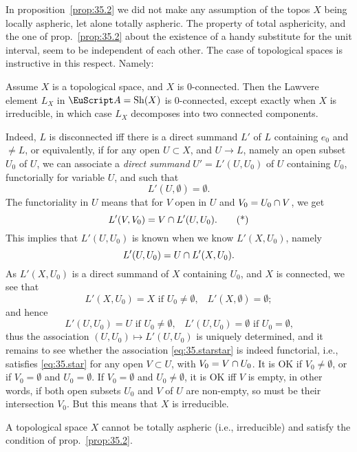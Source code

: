 In proposition~\ref{prop:35.2} we did not make any assumption of the
topos $X$ being locally aspheric, let alone totally aspheric. The
property of total asphericity, and the one of prop.~\ref{prop:35.2} about
the existence of a handy substitute for the unit interval, seem to be
independent of each other. The case of topological spaces is
instructive in this respect. Namely:
\setcounter{corollarynum}{0}
\begin{corollarynum}\label{cor:35.2.1}
  Assume $X$ is a topological space, and $X$ is $0$-connected. Then
  the Lawvere element $L_X$ in $\scrA=\Sh(X)$ is $0$-connected, except
  exactly when $X$ is irreducible, in which case $L_X$ decomposes into
  two connected components.
\end{corollarynum}

Indeed, $L$ is disconnected if{f} there is a direct summand $L'$ of
$L$ containing $e_0$ and $\ne L$, or equivalently, if for any open $U
\subset X$, and $U\to L$, namely an open subset $U_0$ of $U$, we can
associate a \emph{direct summand} $U'=L'(U,U_0)$ of $U$ containing
$U_0$, functorially for variable $U$, and such that
\[ L'(U,\emptyset) = \emptyset.\]
The functoriality in $U$ means that for $V$ open in $U$ and $V_0=U_0
\mathbin{\cap} V$, we get
\begin{equation}
  \label{eq:35.star}
  L'(V,V_0) = V \mathbin{\cap} L'(U,U_0).
  \tag{*} 
\end{equation}
This implies that $L'(U,U_0)$ is known when we know $L'(X,U_0)$,
namely
\[ L'(U,U_0) = U \mathbin{\cap} L'(X,U_0).\]
As $L'(X,U_0)$ is a direct summand of $X$ containing $U_0$, and $X$ is
connected, we see that
\[ \text{$L'(X,U_0) = X$ if $U_0\ne\emptyset$,} \quad
L'(X,\emptyset)=\emptyset; \]
and hence
\begin{equation}
  \label{eq:35.starstar}
  \text{$L'(U,U_0) = U$ if $U_0\ne\emptyset$,} \quad
  \text{$L'(U,U_0) = \emptyset$ if $U_0=\emptyset$,}
  \tag{**}
\end{equation}
thus the association $(U,U_0) \mapsto L'(U,U_0)$ is uniquely
determined, and it remains to see whether the association
\eqref{eq:35.starstar} is indeed functorial, i.e., satisfies
\eqref{eq:35.star} for any open $V \subset U$, with $V_0=V\mathbin{\cap}
U_0$. It is OK if $V_0\ne\emptyset$, or if $V_0=\emptyset$ and
$U_0=\emptyset$. If $V_0=\emptyset$ and $U_0\ne\emptyset$, it is OK
if{f} $V$ is empty, in other words, if both open subsets $U_0$ and $V$
of $U$ are non-empty, so must be their intersection $V_0$. But this
means that $X$ is irreducible.

\begin{corollarynum}\label{cor:35.2.2}
  A topological space $X$ cannot be totally aspheric (i.e.,
  irreducible) and satisfy the condition of prop.~\textup{\ref{prop:35.2}}.
\end{corollarynum}

